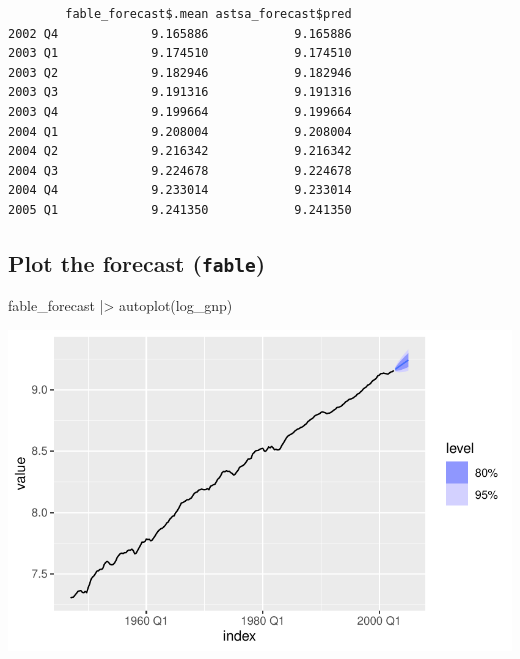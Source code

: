 \documentclass[
  letterpaper,
  DIV=11,
  numbers=noendperiod]{scrartcl}
\newenvironment{Shaded}{\begin{snugshade}}{\end{snugshade}}
\newcommand{\AttributeTok}[1]{\textcolor[rgb]{0.40,0.45,0.13}{#1}}
\newcommand{\DecValTok}[1]{\textcolor[rgb]{0.68,0.00,0.00}{#1}}
\newcommand{\FunctionTok}[1]{\textcolor[rgb]{0.28,0.35,0.67}{#1}}
\newcommand{\NormalTok}[1]{\textcolor[rgb]{0.00,0.23,0.31}{#1}}
\newcommand{\OtherTok}[1]{\textcolor[rgb]{0.00,0.23,0.31}{#1}}
\newcommand{\SpecialCharTok}[1]{\textcolor[rgb]{0.37,0.37,0.37}{#1}}
\begin{document}
\begin{Shaded}
\end{Shaded}

\begin{verbatim}
        fable_forecast$.mean astsa_forecast$pred
2002 Q4             9.165886            9.165886
2003 Q1             9.174510            9.174510
2003 Q2             9.182946            9.182946
2003 Q3             9.191316            9.191316
2003 Q4             9.199664            9.199664
2004 Q1             9.208004            9.208004
2004 Q2             9.216342            9.216342
2004 Q3             9.224678            9.224678
2004 Q4             9.233014            9.233014
2005 Q1             9.241350            9.241350
\end{verbatim}

\subsection{\texorpdfstring{Plot the forecast
(\texttt{fable})}{Plot the forecast (fable)}}\label{plot-the-forecast-fable}

\begin{Shaded}
\begin{Highlighting}[]
\NormalTok{fable\_forecast }\SpecialCharTok{|\textgreater{}} \FunctionTok{autoplot}\NormalTok{(log\_gnp)}
\end{Highlighting}
\end{Shaded}

\includegraphics{Lecture12_files/figure-pdf/unnamed-chunk-8-1.pdf}
\end{document}
